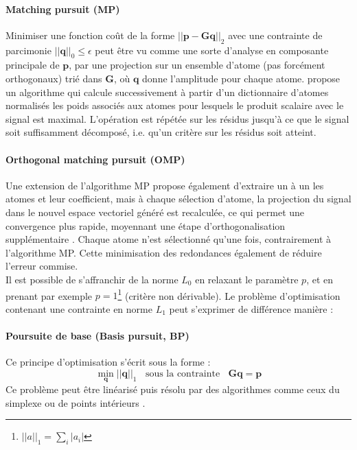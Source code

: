 \paragraph{\tbullet Matching pursuit (MP)} Minimiser une fonction coût de la forme $||\bm{p}-\bm{Gq}||_2$ avec une contrainte de parcimonie $||\bm{q}||_0 \leq \epsilon$ peut être vu comme une sorte d'analyse en composante principale de $\bm{p}$, par une projection sur un ensemble d'atome (pas forcément orthogonaux) trié dans $\bm{G}$, où $\bm{q}$ donne l'amplitude pour chaque atome. \cite{Mallat1993} propose un algorithme qui calcule successivement  à partir d'un dictionnaire d'atomes normalisés les poids associés aux atomes pour lesquels le produit scalaire avec le signal est maximal. L'opération est répétée sur les résidus jusqu'à ce que le signal soit suffisamment décomposé, i.e. qu'un critère sur les résidus soit atteint.

\paragraph{\tbullet Orthogonal matching pursuit (OMP)} Une extension de l'algorithme MP propose également d'extraire un à un les atomes et leur coefficient, mais à chaque sélection d'atome, la projection du signal dans le nouvel espace vectoriel généré est recalculée, ce qui permet une convergence plus rapide, moyennant une étape d’orthogonalisation supplémentaire \citep{Pati1993}. Chaque atome n'est sélectionné qu'une fois, contrairement à l'algorithme MP. Cette minimisation des redondances également de réduire l'erreur commise. \\


Il est possible de s'affranchir de la norme $L_0$ en relaxant le paramètre $p$, et en prenant par exemple $p=1$\footnote{$||a||_1=\sum_i |a_i|$} (critère non dérivable). Le problème d'optimisation contenant une contrainte en norme $L_1$ peut s'exprimer de différence manière :  
\paragraph{\tbullet  Poursuite de base (Basis pursuit, BP)} Ce principe d'optimisation s'écrit sous la forme :
\begin{equation}
\min_{\bm{q}} ||\bm{q}||_1 ~~~~\text{sous la contrainte}~~~~ \bm{Gq}=\bm{p}
\end{equation}
Ce problème peut être linéarisé puis résolu par des algorithmes comme ceux du simplexe  ou de points intérieurs \citep{Chen2001}.

